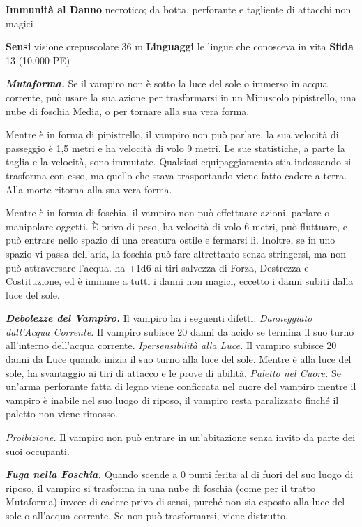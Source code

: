 \begin{multicols}{2}
\textbf{Immunità al Danno} necrotico; da botta, perforante e
tagliente di attacchi non magici

\textbf{Sensi} visione crepuscolare 36 m
\textbf{Linguaggi} le lingue che conosceva in vita \textbf{Sfida} 13
(10.000 PE)\smallskip

\emph{\textbf{Mutaforma.}} Se il vampiro non è sotto la luce del sole o
immerso in acqua corrente, può usare la sua azione per trasformarsi in
un Minuscolo pipistrello, una nube di foschia Media, o per tornare alla
sua vera forma.

Mentre è in forma di pipistrello, il vampiro non può parlare, la sua
velocità di passeggio è 1,5 metri e ha velocità di volo 9 metri. Le sue
statistiche, a parte la taglia e la velocità, sono immutate. Qualsiasi
equipaggiamento stia indossando si trasforma con esso, ma quello che
stava trasportando viene fatto cadere a terra. Alla morte ritorna alla
sua vera forma.

Mentre è in forma di foschia, il vampiro non può effettuare azioni,
parlare o manipolare oggetti. È privo di peso, ha velocità di volo 6
metri, può fluttuare, e può entrare nello spazio di una creatura ostile
e fermarsi lì. Inoltre, se in uno spazio vi passa dell'aria, la foschia
può fare altrettanto senza stringersi, ma non può attraversare l'acqua.
ha +1d6 ai tiri salvezza di Forza, Destrezza e Costituzione, ed è
immune a tutti i danni non magici, eccetto i danni subiti dalla luce del
sole.

\emph{\textbf{Debolezze del Vampiro.}} Il vampiro ha i seguenti difetti:
\emph{Danneggiato dall'Acqua Corrente.} Il vampiro subisce 20 danni da
acido se termina il suo turno all'interno dell'acqua corrente.
\emph{Ipersensibilità alla Luce.} Il vampiro subisce 20 danni da Luce
quando inizia il suo turno alla luce del sole. Mentre è alla luce del
sole, ha svantaggio ai tiri di attacco e le prove di abilità.
\emph{Paletto nel Cuore.} Se un'arma perforante fatta di legno viene
conficcata nel cuore del vampiro mentre il vampiro è inabile nel suo
luogo di riposo, il vampiro resta paralizzato finché il paletto non
viene rimosso.

\emph{Proibizione.} Il vampiro non può entrare in un'abitazione senza
invito da parte dei suoi occupanti.

\emph{\textbf{Fuga nella Foschia.}} Quando scende a 0 punti ferita al di
fuori del suo luogo di riposo, il vampiro si trasforma in una nube di
foschia (come per il tratto Mutaforma) invece di cadere privo di sensi,
purché non sia esposto alla luce del sole o all'acqua corrente. Se non
può trasformarsi, viene distrutto.


\end{multicols}
